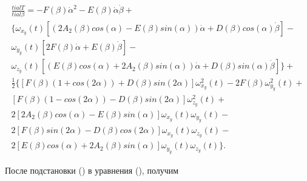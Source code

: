 \begin{equation}%
\label{eq:p3:45}
\begin{multlined}
\frac{ tial T}{ tial \beta }=-F \left( \beta \right) \dot \alpha ^{2}-E \left( \beta \right) \dot \alpha \dot \beta +\\ 
\{ 
	\omega _{x_{y}} 
		\left( t \right) \left[ \left( 2A_{2} \left( \beta \right) cos \left( \alpha \right) -E \left( \beta \right) sin \left( \alpha \right) \right) \dot \alpha +
		D \left( \beta \right) cos \left( \alpha \right) \dot \beta \right] - \\
 	\omega _{y_{y}} 
 		\left( t \right) \left[ 2F \left( \beta \right) \dot \alpha +E \left( \beta \right) \dot \beta \right] - \\
 	\omega_{z_{y}} 
 		\left( t \right) \left[ \left( E \left( \beta \right) cos \left( \alpha \right) +2A_{2} \left( \beta \right) sin \left( \alpha \right) \right) \dot \alpha +
 		D \left( \beta \right) sin \left( \alpha \right) \dot \beta \right] 
\} +\\ 
\frac{1}{2} 
\{ 
	\left[ 
		F \left( \beta \right) \left( 1+cos \left( 2 \alpha \right) \right) +D \left( \beta \right) sin \left( 2 \alpha \right) \right] \omega _{x_{y}}^{2} \left( t \right) -2F \left( \beta \right) \omega _{y_{y}}^{2} \left( t \right) + \\ 
	\left[ 
		F \left( \beta \right) \left( 1-cos \left( 2 \alpha \right) \right) -D \left( \beta \right) sin \left( 2 \alpha \right) \right] \omega _{z_{y}}^{2} \left( t \right) +\\
	2 \left[ 
		2A_{2} \left( \beta \right) cos \left( \alpha \right) -E \left( \beta \right) sin \left( \alpha \right) \right] \omega _{x_{y}} \left( t \right) \omega _{y_{y}} \left( t \right) -\\
	2 \left[ 
		F \left( \beta \right) sin \left( 2 \alpha \right) -D \left( \beta \right) cos \left( 2 \alpha \right) \right] \omega _{x_{y}} \left( t \right) \omega _{z_{y}} \left( t \right) -\\
	2 \left[ 
		E \left( \beta \right) cos \left( \alpha \right) +2A_{2} \left( \beta \right) sin \left( \alpha \right) \right] \omega _{y_{y}} \left( t \right) \omega _{z_{y}} \left( t \right) 
\} .
\end{multlined}
\end{equation}


После подстановки () в уравнения (), получим


